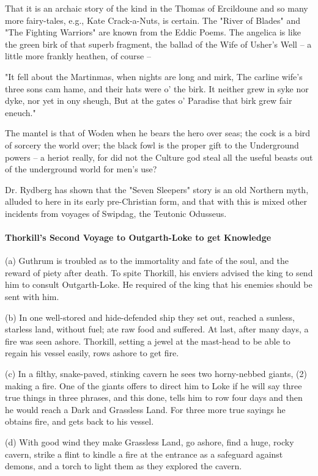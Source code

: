 \documentclass[10pt,a4paper]{report}
\begin{document}
That it is an archaic story of the kind in the Thomas of Ercildoune and so many more fairy-tales, e.g., Kate Crack-a-Nuts, is certain. The "River of Blades" and "The Fighting Warriors" are known from the Eddic Poems. The angelica is like the green birk of that superb fragment, the ballad of the Wife of Usher's Well -- a little more frankly heathen, of course --

\indent "It fell about the Martinmas, when nights are long and mirk,
\indent The carline wife's three sons cam hame, and their hats were
\indent o' the birk.
\indent It neither grew in syke nor dyke, nor yet in ony sheugh,
\indent But at the gates o' Paradise that birk grew fair eneuch."

The mantel is that of Woden when he bears the hero over seas; the cock is a bird of sorcery the world over; the black fowl is the proper gift to the Underground powers -- a heriot really, for did not the Culture god steal all the useful beasts out of the underground world for men's use?

Dr. Rydberg has shown that the "Seven Sleepers" story is an old Northern myth, alluded to here in its early pre-Christian form, and that with this is mixed other incidents from voyages of Swipdag, the Teutonic Odusseus.

\paragraph*{Thorkill's Second Voyage to Outgarth-Loke to get Knowledge}
(a) Guthrum is troubled as to the immortality and fate of the soul, and the reward of piety after death. To spite Thorkill, his enviers advised the king to send him to consult Outgarth-Loke. He required of the king that his enemies should be sent with him.

(b) In one well-stored and hide-defended ship they set out, reached a sunless, starless land, without fuel; ate raw food and suffered. At last, after many days, a fire was seen ashore. Thorkill, setting a jewel at the mast-head to be able to regain his vessel easily, rows ashore to get fire.

(c) In a filthy, snake-paved, stinking cavern he sees two horny-nebbed giants, (2) making a fire. One of the giants offers to direct him to Loke if he will say three true things in three phrases, and this done, tells him to row four days and then he would reach a Dark and Grassless Land. For three more true sayings he obtains fire, and gets back to his vessel.

(d) With good wind they make Grassless Land, go ashore, find a huge, rocky cavern, strike a flint to kindle a fire at the entrance as a safeguard against demons, and a torch to light them as they explored the cavern.
\end{document}
